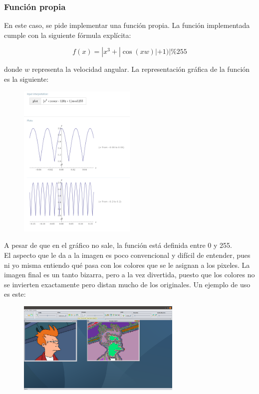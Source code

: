 \documentclass[11pt,a4paper]{article}
\begin{document}
\subsubsection{Función propia}
En este caso, se pide implementar una función propia. La función implementada cumple con la siguiente fórmula explícita:

\[f(x)=|x^3+|\cos(xw)|+1)|\%255\]

donde $w$ representa la velocidad angular. La representación gráfica de la función es la siguiente:

\begin{figure}[H]
\centering
	\includegraphics[width=0.5\textwidth]{img/plot.png}
\end{figure}

A pesar de que en el gráfico no sale, la función está definida entre 0 y 255.\\

El aspecto que le da a la imagen es poco convencional y difícil de entender, pues ni yo misma entiendo qué pasa con los colores que se le asignan a los pixeles. La imagen final es un tanto bizarra, pero a la vez divertida, puesto que los colores no se invierten exactamente pero distan mucho de los originales. Un ejemplo de uso es este:

\begin{figure}[H]
\centering
	\includegraphics[width=0.7\textwidth]{img/propia.png}
\end{figure}
\end{document}
